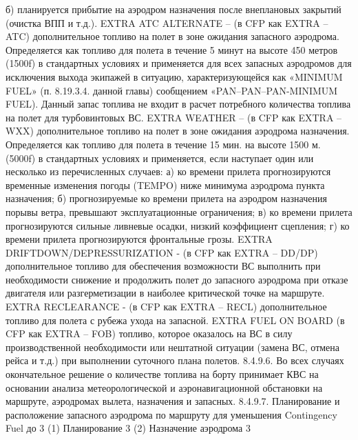 б)	планируется прибытие на аэродром назначения после внеплановых закрытий (очистка ВПП и т.д.).
EXTRA ATC ALTERNATE – (в CFP как EXTRA – ATC) дополнительное топливо на полет в зоне ожидания запасного аэродрома. Определяется как топливо для полета в течение 5 минут на высоте 450 метров (1500f) в стандартных условиях и применяется для всех запасных аэродромов для исключения выхода экипажей в ситуацию, характеризующейся как «MINIMUM FUEL» (п. 8.19.3.4. данной главы) сообщением «PAN–PAN–PAN-MINIMUM FUEL). 
Данный запас топлива не входит в расчет потребного количества топлива на полет для турбовинтовых ВС.
EXTRA WEATHER – (в CFP как EXTRA – WXX) дополнительное топливо на полет в зоне ожидания аэродрома назначения. Определяется как топливо для полета в течение 15 мин. на высоте 1500 м. (5000f) в стандартных условиях и применяется, если наступает один или несколько из перечисленных случаев: 
а)	ко времени прилета прогнозируются временные изменения погоды (TEMPO) ниже минимума аэродрома пункта назначения; 
б)	прогнозируемые ко времени прилета на аэродром назначения порывы ветра, превышают эксплуатационные ограничения; 
в)	ко времени прилета прогнозируются сильные ливневые осадки, низкий коэффициент сцепления; 
г)	ко времени прилета прогнозируются фронтальные грозы. 
EXTRA DRIFTDOWN/DEPRESSURIZATION - (в CFP как EXTRA – DD/DP) дополнительное топливо для обеспечения возможности ВС выполнить при необходимости снижение и продолжить полет до запасного аэродрома при отказе двигателя или разгерметизации в наиболее критической точке на маршруте. 
EXTRA RECLEARANCE - (в CFP как EXTRA – RECL) дополнительное топливо для полета с рубежа ухода на запасной. 
EXTRA FUEL ON BOARD (в CFP как EXTRA – FOB) топливо, которое оказалось на ВС в силу производственной необходимости или нештатной ситуации (замена ВС, отмена рейса и т.д.) при выполнении суточного плана полетов. 
8.4.9.6. Во всех случаях окончательное решение о количестве топлива на борту принимает КВС на основании анализа метеорологической и аэронавигационной обстановки на маршруте, аэродромах вылета, назначения и запасных. 
8.4.9.7. Планирование и расположение запасного аэродрома по маршруту для уменьшения Contingency Fuel до 3%
(1) Планирование 3%
(2) Назначение аэродрома 3%
